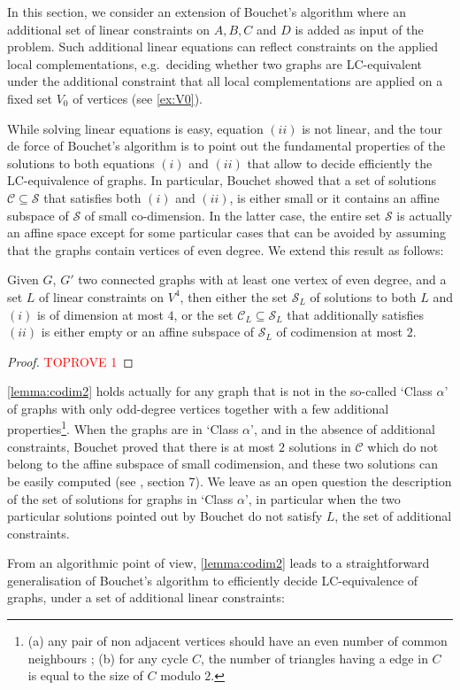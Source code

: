 \documentclass[a4paper,UKenglish,cleveref,autoref,thm-restate]{arxiv}
\begin{document}
In this section, we consider an extension of Bouchet's algorithm where an additional set of linear constraints on $A,B,C$ and $D$ is added as input of the problem. Such additional linear equations can reflect constraints on the applied  local complementations, e.g.~deciding whether two graphs are LC-equivalent under the additional constraint that all local complementations are applied on a fixed set $V_0$ of vertices (see \cref{ex:V0}).



While solving linear equations is easy, equation $(ii)$ is not linear, and the tour de force of Bouchet's algorithm is to point out the fundamental properties of the solutions to both equations $(i)$ and $(ii)$ that allow to decide efficiently the LC-equivalence of graphs.  In particular, Bouchet showed that a set of solutions $\mathcal C\subseteq \mathcal S$ that satisfies both $(i)$ and $(ii)$,  is either small or it contains an affine subspace of $\mathcal S$ of small co-dimension. In  the latter case, the entire set $\mathcal S$ is  actually an affine space except for  some particular cases that can be avoided by assuming that the graphs contain vertices of even degree. We extend this result as follows:

\begin{lemma}\label{lemma:codim2}
Given $G$, $G'$ two connected graphs with at least one vertex of even degree, and a set $L$  of linear constraints on $V^4$,
 then either the set $\mathcal S_L$ of solutions to both $ L$ and $(i)$ is of dimension at most $4$, 
 or the set  $\mathcal C_L\subseteq \mathcal S_L$ that additionally satisfies  $(ii)$ is either empty or an affine subspace of $\mathcal S_L$ of codimension at most $2$.   
\end{lemma}

\begin{proof}\textcolor{red}{TOPROVE 1}\end{proof}

\begin{remark} \cref{lemma:codim2} holds actually for any graph that is not in the so-called `Class $\alpha$' of graphs with only odd-degree vertices together with a few additional properties\footnote{(a) any pair of non adjacent vertices should have an even number of common neighbours ; (b) for any cycle $C$, the number of triangles having a edge in $C$ is equal to the size of $C$ modulo $2$.}.  When the graphs are in  `Class $\alpha$', and in the absence of additional constraints, Bouchet proved that there is at most $2$ solutions in $\mathcal C$ which do not belong to the affine subspace of small codimension, and these two solutions can be easily computed (see \cite{Bouchet1991}, section 7).  We leave as an open question the description of the set of solutions for graphs in `Class $\alpha$', in particular when the two particular solutions pointed out by Bouchet do not satisfy $L$, the set of additional constraints. 
\end{remark}
From an algorithmic point of view, \cref{lemma:codim2} leads to a straightforward generalisation of Bouchet's algorithm to  efficiently decide LC-equivalence of graphs, under a set of additional linear constraints: 
\end{document}
